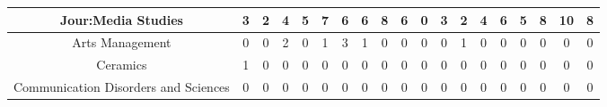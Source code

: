 \documentclass[10]{article}
\begin{document}
\begin{landscape}
\begin{longtable}[c]{|ccccccccccccccccccc|}
	\multicolumn{1}{|c|}{Jour:Media Studies}                         & \multicolumn{1}{c|}{3}          & \multicolumn{1}{c|}{2}          & \multicolumn{1}{c|}{4}          & \multicolumn{1}{c|}{5}          & \multicolumn{1}{c|}{7}          & \multicolumn{1}{c|}{6}          & \multicolumn{1}{c|}{6}          & \multicolumn{1}{c|}{8}          & \multicolumn{1}{c|}{6}          & \multicolumn{1}{c|}{0}          & \multicolumn{1}{c|}{3}          & \multicolumn{1}{c|}{2}          & \multicolumn{1}{c|}{4}          & \multicolumn{1}{c|}{6}          & \multicolumn{1}{c|}{5}          & \multicolumn{1}{c|}{8}          & \multicolumn{1}{c|}{10}         & 8          \\ \hline
	\multicolumn{1}{|c|}{Arts Management}                            & \multicolumn{1}{c|}{0}          & \multicolumn{1}{c|}{0}          & \multicolumn{1}{c|}{2}          & \multicolumn{1}{c|}{0}          & \multicolumn{1}{c|}{1}          & \multicolumn{1}{c|}{3}          & \multicolumn{1}{c|}{1}          & \multicolumn{1}{c|}{0}          & \multicolumn{1}{c|}{0}          & \multicolumn{1}{c|}{0}          & \multicolumn{1}{c|}{0}          & \multicolumn{1}{c|}{1}          & \multicolumn{1}{c|}{0}          & \multicolumn{1}{c|}{0}          & \multicolumn{1}{c|}{0}          & \multicolumn{1}{c|}{0}          & \multicolumn{1}{c|}{0}          & 0          \\ \hline
	\multicolumn{1}{|c|}{Ceramics}                                   & \multicolumn{1}{c|}{1}          & \multicolumn{1}{c|}{0}          & \multicolumn{1}{c|}{0}          & \multicolumn{1}{c|}{0}          & \multicolumn{1}{c|}{0}          & \multicolumn{1}{c|}{0}          & \multicolumn{1}{c|}{0}          & \multicolumn{1}{c|}{0}          & \multicolumn{1}{c|}{0}          & \multicolumn{1}{c|}{0}          & \multicolumn{1}{c|}{0}          & \multicolumn{1}{c|}{0}          & \multicolumn{1}{c|}{0}          & \multicolumn{1}{c|}{0}          & \multicolumn{1}{c|}{0}          & \multicolumn{1}{c|}{0}          & \multicolumn{1}{c|}{0}          & 0          \\ \hline
	\multicolumn{1}{|c|}{Communication Disorders and Sciences}       & \multicolumn{1}{c|}{0}          & \multicolumn{1}{c|}{0}          & \multicolumn{1}{c|}{0}          & \multicolumn{1}{c|}{0}          & \multicolumn{1}{c|}{0}          & \multicolumn{1}{c|}{0}          & \multicolumn{1}{c|}{0}          & \multicolumn{1}{c|}{0}          & \multicolumn{1}{c|}{0}          & \multicolumn{1}{c|}{0}          & \multicolumn{1}{c|}{0}          & \multicolumn{1}{c|}{0}          & \multicolumn{1}{c|}{0}          & \multicolumn{1}{c|}{0}          & \multicolumn{1}{c|}{0}          & \multicolumn{1}{c|}{0}          & \multicolumn{1}{c|}{0}          & 0          \\ \hline

\end{longtable}
\end{landscape}
\end{document}
